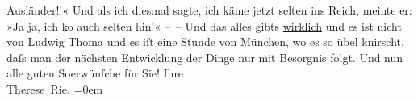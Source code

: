\begin{ledgroupsized}[t]{13cm}
                    Ausländer!!«\pend
           \pstart
           Und als ich diesmal sagte, ich käme jetzt selten ins Reich, meinte er: »Ja ja, ich ko{\geminationm} auch
                    selten hin!« – – Und das alles gibts \uline{wirklich}
                    und es ist nicht von Ludwig Thoma und es iſt
                    eine Stunde von München, wo {\pb}es so übel knirscht, daſs man der nächsten Entwicklung
                    der Dinge nur mit Besorgnis folgt.\pend
           \pstart
           Und nun alle guten So{\geminationm}erwünſche für Sie!\pend
           \pstart
           Ihre{\\[\baselineskip]}\spacefill\mbox{Therese Rie.}\pend
           \leftskip=0em{}
         
         \endnumbering{}\end{ledgroupsized}  \newcommand{\dateiname}{L02573}\newcommand{\titel}{Therese Rie-Andro an Arthur Schnitzler, [Anfang Juli 1923]}\newcommand{\editorInnen}{Martin Anton Müller und Gerd-Hermann Susen}
      